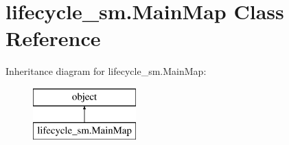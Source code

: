 \hypertarget{classlifecycle__sm_1_1_main_map}{\section{lifecycle\-\_\-sm.\-Main\-Map Class Reference}
\label{classlifecycle__sm_1_1_main_map}
}
Inheritance diagram for lifecycle\-\_\-sm.\-Main\-Map\-:\begin{figure}[H]
\begin{center}
\leavevmode
\includegraphics[height=2.000000cm]{classlifecycle__sm_1_1_main_map}
\end{center}
\end{figure}
